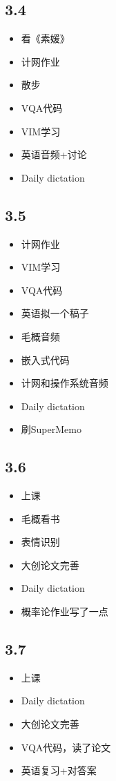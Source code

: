 \documentclass[UTF8]{ctexart}
\begin{document}
\subsection*{3.4}
\begin{itemize}
    \item 看《素媛》
    \item 计网作业
    \item 散步
    \item VQA代码
    \item VIM学习
    \item 英语音频+讨论
    \item Daily dictation
\end{itemize}
\subsection*{3.5}
\begin{itemize}
    \item 计网作业
    \item VIM学习
    \item VQA代码
    \item 英语拟一个稿子
    \item 毛概音频
    \item 嵌入式代码
    \item 计网和操作系统音频
    \item Daily dictation
    \item 刷SuperMemo
\end{itemize}
\subsection*{3.6}
\begin{itemize}
    \item 上课
    \item 毛概看书
    \item 表情识别
    \item 大创论文完善
    \item Daily dictation
    \item 概率论作业写了一点
\end{itemize}
\subsection*{3.7}
\begin{itemize}
    \item 上课
    \item Daily dictation
    \item 大创论文完善
    \item VQA代码，读了论文
    \item 英语复习+对答案
\end{itemize}
\end{document}
